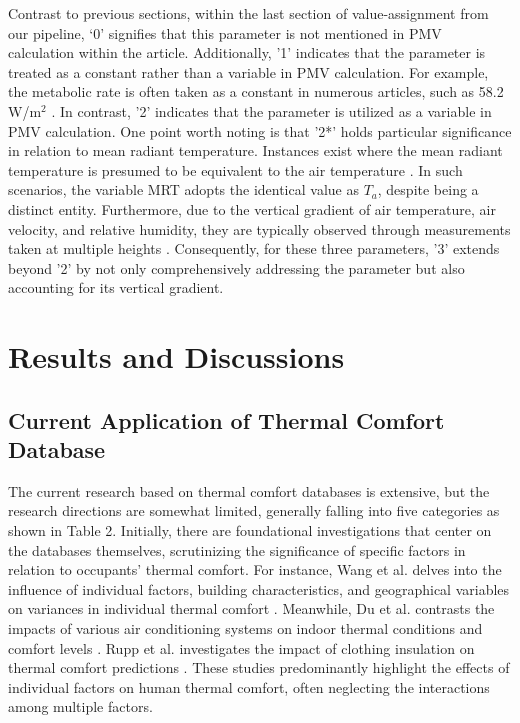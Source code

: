 \documentclass[final,3p,times,12pt]{elsarticle}
\begin{document}
Contrast to previous sections, within the last section of value-assignment from our pipeline, ‘0' signifies that this parameter is not mentioned in PMV calculation within the article. Additionally, '1' indicates that the parameter is treated as a constant rather than a variable in PMV calculation. For example, the metabolic rate is often taken as a constant in numerous articles, such as 58.2 W/m$^2$ \cite{luoExploringDynamicProcess2016,wangThermalResponsesDifferent2011,wangThermalComfortNaturally2010}. In contrast, '2' indicates that the parameter is utilized as a variable in PMV calculation. One point worth noting is that '2*' holds particular significance in relation to mean radiant temperature. Instances exist where the mean radiant temperature is presumed to be equivalent to the air temperature \cite{mouFieldStudyThermal2022,duMethodDeterminingAcceptable2021}. In such scenarios, the variable MRT adopts the identical value as $T_a$, despite being a distinct entity. Furthermore, due to the vertical gradient of air temperature, air velocity, and relative humidity, they are typically observed through measurements taken at multiple heights \cite{yangAdaptiveThermalComfort2020,zhangThermalComfortNaturally2010,zhangThermalComfortBuildings2013}. Consequently, for these three parameters, '3' extends beyond '2' by not only comprehensively addressing the parameter but also accounting for its vertical gradient.

\section{Results and Discussions}
\label{subsec1}

\subsection{Current Application of Thermal Comfort Database }
\label{subsec1}

The current research based on thermal comfort databases is extensive, but the research directions are somewhat limited, generally falling into five categories as shown in Table 2. Initially, there are foundational investigations that center on the databases themselves, scrutinizing the significance of specific factors in relation to occupants' thermal comfort. For instance, Wang et al. delves into the influence of individual factors, building characteristics, and geographical variables on variances in individual thermal comfort \cite{wangRevisitingIndividualGroup2020a}. Meanwhile, Du et al. contrasts the impacts of various air conditioning systems on indoor thermal conditions and comfort levels \cite{duComparisonThermalComfort2022a}. Rupp et al. investigates the impact of clothing insulation on thermal comfort predictions \cite{ruppInvestigatingCurrentTrends2021a}. These studies predominantly highlight the effects of individual factors on human thermal comfort, often neglecting the interactions among multiple factors. 
\end{document}
